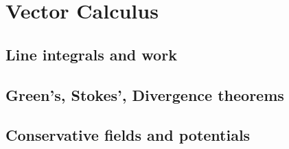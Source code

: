 
\section{Vector Calculus}

\subsection{Line integrals and work}


\subsection{Green's, Stokes', Divergence theorems}


\subsection{Conservative fields and potentials}

